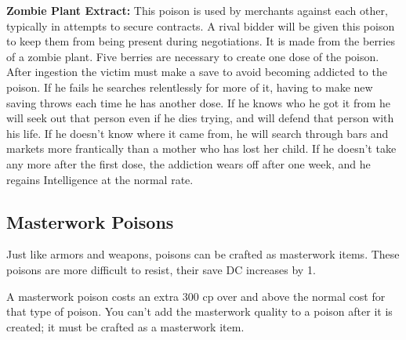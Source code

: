 \textbf{Zombie Plant Extract:} This poison is used by merchants against each other, typically in attempts to secure contracts. A rival bidder will be given this poison to keep them from being present during negotiations. It is made from the berries of a zombie plant. Five berries are necessary to create one dose of the poison. After ingestion the victim must make a save to avoid becoming addicted to the poison. If he fails he searches relentlessly for more of it, having to make new saving throws each time he has another dose. If he knows who he got it from he will seek out that person even if he dies trying, and will defend that person with his life. If he doesn't know where it came from, he will search through bars and markets more frantically than a mother who has lost her child. If he doesn't take any more after the first dose, the addiction wears off after one week, and he regains Intelligence at the normal rate.

\subsection{Masterwork Poisons}
Just like armors and weapons, poisons can be crafted as masterwork items. These poisons are more difficult to resist, their save DC increases by 1.

A masterwork poison costs an extra 300 cp over and above the normal cost for that type of poison. You can't add the masterwork quality to a poison after it is created; it must be crafted as a masterwork item.